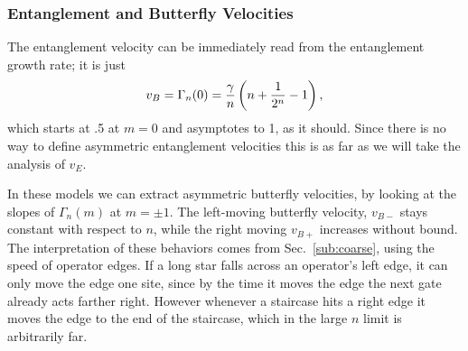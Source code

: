 \subsubsection{Entanglement and Butterfly Velocities} \label{susub:vels}

The entanglement velocity can be immediately read from the entanglement growth rate; it is just 
\begin{align}
v_B=\Gamma_n(0)=\frac{\gamma}{n}\left(n+\frac{1}{2^n}-1\right),
\end{align}
which starts at .5 at $m=0$ and asymptotes to 1, as it should. Since there is no way to define asymmetric entanglement velocities this is as far as we will take the analysis of $v_E$.

%
%

In these models we can extract asymmetric butterfly velocities, by looking at the slopes of $\Gamma_n(m)$ at $m=\pm 1$. The left-moving butterfly velocity, $v_{B-}$ stays constant with respect to $n$, while the right moving $v_{B+}$ increases without bound. The interpretation of these behaviors comes from Sec.~\ref{sub:coarse}, using the speed of operator edges. If a long star falls across an operator's left edge, it can only move the edge one site, since by the time it moves the edge the next gate already acts farther right. However whenever a staircase hits a right edge it moves the edge to the end of the staircase, which in the large $n$ limit is arbitrarily far.

